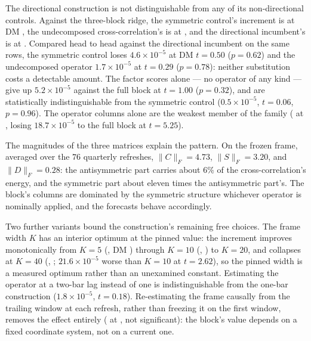 The directional construction is not distinguishable from any of its
non-directional controls. Against the three-block ridge, the symmetric
control's increment is \unifIncrBlkFourTrailSymDQ{} at DM
\unifIncrBlkFourTrailSymDM{}, the undecomposed cross-correlation's is
\unifIncrBlkFourTrailFullCDQ{} at \unifIncrBlkFourTrailFullCDM{}, and the
directional incumbent's is \unifIncrBlkFourTrailDQ{} at
\unifIncrBlkFourTrailDM{}. Compared head to head against the directional
incumbent on the same rows, the symmetric control loses
$4.6 \times 10^{-5}$ at DM $t = 0.50$ ($p = 0.62$) and the undecomposed
operator $1.7 \times 10^{-5}$ at $t = 0.29$ ($p = 0.78$): neither
substitution costs a detectable amount. The factor scores alone --- no
operator of any kind --- give up $5.2 \times 10^{-5}$ against the full
block at $t = 1.00$ ($p = 0.32$), and are statistically indistinguishable
from the symmetric control ($0.5 \times 10^{-5}$, $t = 0.06$, $p =
0.96$). The operator columns alone are the weakest member of the family
(\unifIncrBlkFourTrailGhatDQ{} at \unifIncrBlkFourTrailGhatDM{}, losing
$18.7 \times 10^{-5}$ to the full block at $t = 5.25$).

The magnitudes of the three matrices explain the pattern. On the frozen
frame, averaged over the $76$ quarterly refreshes, $\lVert C \rVert_F =
4.73$, $\lVert S \rVert_F = 3.20$, and $\lVert D \rVert_F = 0.28$: the
antisymmetric part carries about $6\%$ of the cross-correlation's energy,
and the symmetric part about eleven times the antisymmetric part's. The
block's columns are dominated by the symmetric structure whichever
operator is nominally applied, and the forecasts behave accordingly.

Two further variants bound the construction's remaining free choices. The
frame width $K$ has an interior optimum at the pinned value: the
increment improves monotonically from $K = 5$ (\unifIncrBlkFourTrailKFiveDQ{},
DM \unifIncrBlkFourTrailKFiveDM{}) through $K = 10$
(\unifIncrBlkFourTrailKTenDQ{}, \unifIncrBlkFourTrailKTenDM{}) to $K = 20$, and
collapses at $K = 40$ (\unifIncrBlkFourTrailKFortyDQ{},
\unifIncrBlkFourTrailKFortyDM{}; $21.6 \times 10^{-5}$ worse than $K = 10$ at
$t = 2.62$), so the pinned width is a measured optimum rather than an
unexamined constant. Estimating the operator at a two-bar lag instead of
one is indistinguishable from the one-bar construction
($1.8 \times 10^{-5}$, $t = 0.18$). Re-estimating the frame causally from
the trailing window at each refresh, rather than freezing it on the first
window, removes the effect entirely (\unifIncrBlkFourTrailRefreshDQ{} at
\unifIncrBlkFourTrailRefreshDM{}, not significant): the block's value depends
on a fixed coordinate system, not on a current one.

